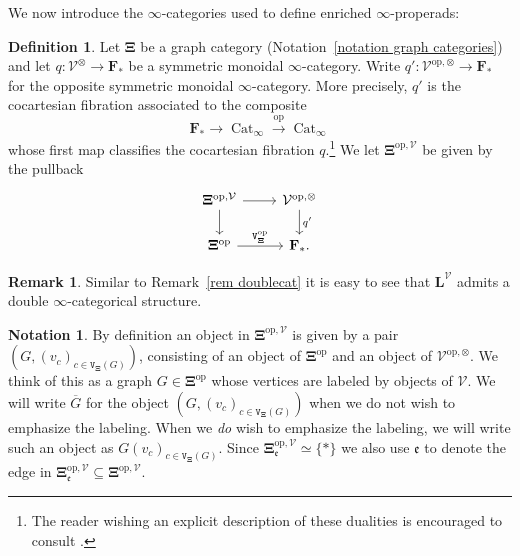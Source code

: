 \documentclass{amsart}
\numberwithin{theorem}{subsection}
\theoremstyle{definition}
\newtheorem{definition}[theorem]{Definition}
\newtheorem{notation}[theorem]{Notation}
\newtheorem{remark}[theorem]{Remark}
\providecommand{\op}{\mathrm{op}}
\newcommand{\finsetskel}{\mathbf{F}}
\newcommand{\pfinsetskel}{\finsetskel_*}
\newcommand{\xCat}{\operatorname{Cat}}
\newcommand{\xV}{\mathcal{V}}
\newcommand{\xfe}{\mathfrak{e}}
\newcommand{\levelg}{\mathbf{L}}
\newcommand{\levelV}{\levelg^\xV}
\newcommand{\gc}{\mathbf{\Xi}}
\newcommand{\opgcV}{\gc^{\op,\xV}}
\newcommand{\vertex}{\mathtt{V}}
\begin{document}
We now introduce the $\infty$-categories used to define enriched $\infty$-properads:
\begin{definition}\label{def LV_YV}
Let $\gc$ be a graph category (Notation~\ref{notation graph categories}) and let $q \colon \xV^\otimes \to \pfinsetskel$ be a symmetric monoidal $\infty$-category.
Write $q' \colon \xV^{\op,\otimes} \to \pfinsetskel$ for the opposite symmetric monoidal $\infty$-category.
More precisely, 
$q'$ is the cocartesian fibration associated to the composite
\[
	\pfinsetskel \to \xCat_\infty \xrightarrow{\op} \xCat_\infty
\]
whose first map classifies the cocartesian fibration $q$.\footnote{The reader wishing an explicit description of these dualities is encouraged to consult \cite{BarwickGlasmanNardin}.} 
We let $\gc^{\op, \xV}$ be given by the pullback
\[ \begin{tikzcd}
\gc^{\op, \xV} \rar \dar &  \xV^{\op,\otimes} \dar{q'} \\
\gc^\op \rar{\vertex^\op_{\gc}} & \pfinsetskel.
\end{tikzcd} \]
\end{definition}
\begin{remark}\label{rem doublecatV}
	Similar to Remark~\ref{rem doublecat} it is easy to see that $\levelV$ admits a double $\infty$-categorical structure.
\end{remark}

\begin{notation}\label{notation: bar G}
By definition an object in ${\gc^{\op, \xV}}$ is given by a pair $(G, (v_c)_{c\in \vertex_{\gc}(G)})$, consisting of an object of $\gc^\op$ and an object of $\xV^{\op,\otimes}$.
We think of this as a graph $G\in \gc^\op$ whose vertices are labeled by objects of $\xV$. 
We will write $\overline G$ for the object $(G, (v_c)_{c\in \vertex_{\gc}(G)})$ when we do not wish to emphasize the labeling.
When we \emph{do} wish to emphasize the labeling, we will write such an object as $G(v_c)_{c\in \vertex_{\gc}(G)}$.
Since $\opgcV_{\xfe}\simeq \{*\}$ we also use $\xfe$ to denote the edge in $\opgcV_{\mathfrak e} \subseteq \opgcV$.
\end{notation}
\end{document}
